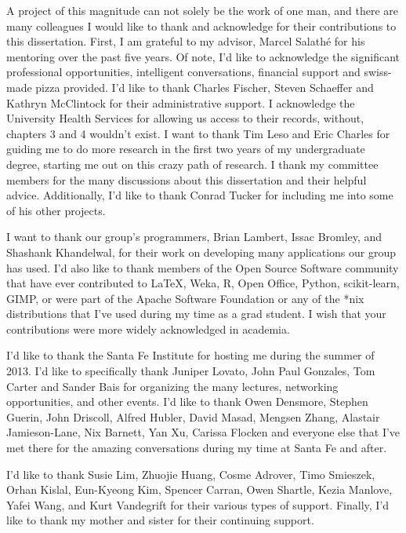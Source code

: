 A project of this magnitude can not solely be the work of one man, and there are many colleagues I would like to thank and acknowledge for their contributions to this dissertation. First, I am grateful to my advisor, Marcel Salath\'e for his mentoring over the past five years. Of note, I'd like to acknowledge the significant professional opportunities, intelligent conversations, financial support and swiss-made pizza provided. I'd like to thank Charles Fischer, Steven Schaeffer and Kathryn McClintock for their administrative support. I acknowledge the University Health Services for allowing us access to their records, without, chapters 3 and 4 wouldn't exist. I want to thank Tim Leso and Eric Charles for guiding me to do more research in the first two years of my undergraduate degree, starting me out on this crazy path of research. I thank my committee members for the many discussions about this dissertation and their helpful advice. Additionally, I'd like to thank Conrad Tucker for including me into some of his other projects.

I want to thank our group's programmers, Brian Lambert, Issac Bromley, and Shashank Khandelwal, for their work on developing many applications our group has used. I'd also like to thank members of the Open Source Software community that have ever contributed to \LaTeX, Weka, R, Open Office, Python, scikit-learn, GIMP, or were part of the Apache Software Foundation or any of the *nix distributions that I've used during my time as a grad student. I wish that your contributions were more widely acknowledged in academia.

I'd like to thank the Santa Fe Institute for hosting me during the summer of 2013. I'd like to specifically thank Juniper Lovato, John Paul Gonzales, Tom Carter and Sander Bais for organizing the many lectures, networking opportunities, and other events. I'd like to thank Owen Densmore, Stephen Guerin, John Driscoll, Alfred Hubler, David Masad, Mengsen Zhang, Alastair Jamieson-Lane, Nix Barnett, Yan Xu, Carissa Flocken and everyone else that I've met there for the amazing conversations during my time at Santa Fe and after.  

I'd like to thank Susie Lim, Zhuojie Huang, Cosme Adrover, Timo Smieszek, Orhan Kislal, Eun-Kyeong Kim, Spencer Carran, Owen Shartle, Kezia Manlove, Yafei Wang, and Kurt Vandegrift for their various types of support. Finally, I'd like to thank my mother and sister for their continuing support. 

